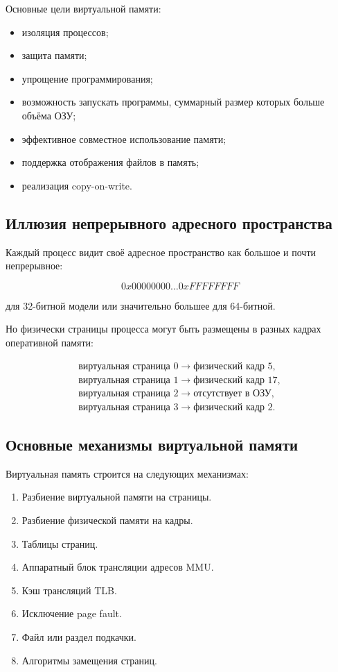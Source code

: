 \documentclass[a4paper,12pt]{article}
\begin{document}
Основные цели виртуальной памяти:

\begin{itemize}
    \item изоляция процессов;
    \item защита памяти;
    \item упрощение программирования;
    \item возможность запускать программы, суммарный размер которых больше объёма ОЗУ;
    \item эффективное совместное использование памяти;
    \item поддержка отображения файлов в память;
    \item реализация copy-on-write.
\end{itemize}

\subsection{Иллюзия непрерывного адресного пространства}

Каждый процесс видит своё адресное пространство как большое и почти непрерывное:

\[
0x00000000 \ldots 0xFFFFFFFF
\]

для 32-битной модели или значительно большее для 64-битной.

Но физически страницы процесса могут быть размещены в разных кадрах оперативной памяти:

\[
\begin{array}{c}
\text{виртуальная страница 0} \rightarrow \text{физический кадр 5},\\
\text{виртуальная страница 1} \rightarrow \text{физический кадр 17},\\
\text{виртуальная страница 2} \rightarrow \text{отсутствует в ОЗУ},\\
\text{виртуальная страница 3} \rightarrow \text{физический кадр 2}.
\end{array}
\]

\subsection{Основные механизмы виртуальной памяти}

Виртуальная память строится на следующих механизмах:

\begin{enumerate}
    \item Разбиение виртуальной памяти на страницы.
    \item Разбиение физической памяти на кадры.
    \item Таблицы страниц.
    \item Аппаратный блок трансляции адресов MMU.
    \item Кэш трансляций TLB.
    \item Исключение page fault.
    \item Файл или раздел подкачки.
    \item Алгоритмы замещения страниц.
\end{enumerate}
\end{document}
